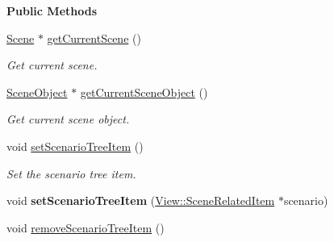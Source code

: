 \begin{Indent}\textbf{ Public Methods}\par
\begin{DoxyCompactItemize}
\item 
\mbox{\label{classrev_1_1_view_1_1_scene_tree_widget_a72ff111331de0055a5ce4c14168b9f1d}} 
\mbox{\hyperlink{classrev_1_1_scene}{Scene}} $\ast$ \mbox{\hyperlink{classrev_1_1_view_1_1_scene_tree_widget_a72ff111331de0055a5ce4c14168b9f1d}{get\+Current\+Scene}} ()
\begin{DoxyCompactList}\small\item\em Get current scene. \end{DoxyCompactList}\item 
\mbox{\label{classrev_1_1_view_1_1_scene_tree_widget_a41d50eb2f345d723c0443ae32d40fe35}} 
\mbox{\hyperlink{classrev_1_1_scene_object}{Scene\+Object}} $\ast$ \mbox{\hyperlink{classrev_1_1_view_1_1_scene_tree_widget_a41d50eb2f345d723c0443ae32d40fe35}{get\+Current\+Scene\+Object}} ()
\begin{DoxyCompactList}\small\item\em Get current scene object. \end{DoxyCompactList}\item 
\mbox{\label{classrev_1_1_view_1_1_scene_tree_widget_a309b552a8b0f2a36887d367bc073811c}} 
void \mbox{\hyperlink{classrev_1_1_view_1_1_scene_tree_widget_a309b552a8b0f2a36887d367bc073811c}{set\+Scenario\+Tree\+Item}} ()
\begin{DoxyCompactList}\small\item\em Set the scenario tree item. \end{DoxyCompactList}\item 
\mbox{\label{classrev_1_1_view_1_1_scene_tree_widget_ace3ae2d6297f12685c19b62e04a3ac1d}} 
void {\bfseries set\+Scenario\+Tree\+Item} (\mbox{\hyperlink{classrev_1_1_view_1_1_scene_related_item}{View\+::\+Scene\+Related\+Item}} $\ast$scenario)
\item 
\mbox{\label{classrev_1_1_view_1_1_scene_tree_widget_ac011ca4db0cd24a364bfc346774aad5e}} 
void \mbox{\hyperlink{classrev_1_1_view_1_1_scene_tree_widget_ac011ca4db0cd24a364bfc346774aad5e}{remove\+Scenario\+Tree\+Item}} ()

\end{DoxyCompactItemize}
\end{Indent}
